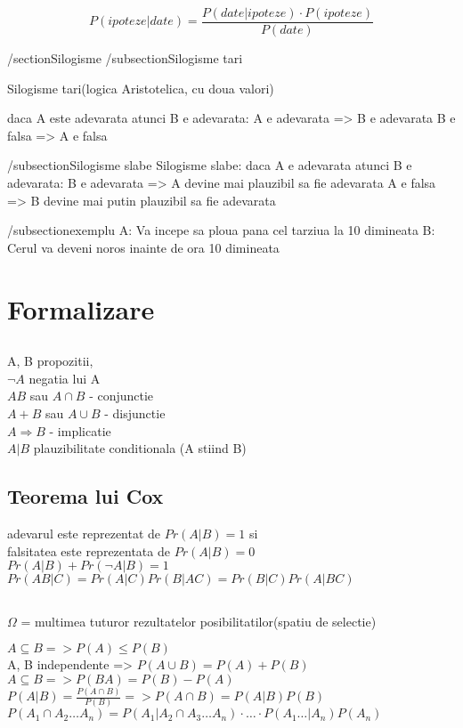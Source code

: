 \[P(ipoteze | date) = \frac{P(date | ipoteze) \cdot P(ipoteze)}{P(date)}\]

/section{Silogisme}
/subsection{Silogisme tari}

Silogisme tari(logica Aristotelica, cu doua valori)

daca A este adevarata atunci B e adevarata:
A e adevarata => B e adevarata
B e falsa => A e falsa

/subsection{Silogisme slabe}
Silogisme slabe:
daca A e adevarata atunci B e adevarata:
B e adevarata => A devine mai plauzibil sa fie adevarata
A e falsa => B devine mai putin plauzibil sa fie adevarata

/subsection{exemplu}
A: Va incepe sa ploua pana cel tarziua la 10 dimineata
B: Cerul va deveni noros inainte de ora 10 dimineata

\section{Formalizare}
\subsection{}
A, B propozitii,\\
$\neg A$ negatia lui A\\
$AB$ sau $A \cap B$ - conjunctie\\
$A+B$ sau $A \cup B$ - disjunctie\\
$A \Rightarrow B$ - implicatie\\
$A|B$ plauzibilitate conditionala (A stiind B)\\

\subsection{Teorema lui Cox}
adevarul este reprezentat de $Pr(A|B) = 1$ si \\
falsitatea este reprezentata de $Pr(A|B) = 0$\\
$Pr(A|B) + Pr(\neg A | B) = 1$\\
$Pr(AB|C) = Pr(A|C)Pr(B|AC) = Pr(B|C)Pr(A|BC)$\\

\subsection{}

$\Omega$ = multimea tuturor rezultatelor posibilitatilor(spatiu de selectie)

$A \subseteq B => P(A) \le P(B)$\\
A, B independente => $P(A \cup B) = P(A) + P(B)$\\
$A \subseteq B => P(BA) = P(B)-P(A)$\\
$P(A|B) = \frac{P(A \cap B)}{P(B)} => P(A \cap B) = P(A|B)P(B)$\\
$P(A_1 \cap A_2 \ldots A_n) = P(A_1 | A_2 \cap A_3 \ldots A_n) \cdot \ldots \cdot P(A_1 \ldots | A_n) P(A_n)$\\


